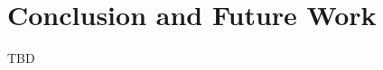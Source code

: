 \documentclass[conference]{IEEEtran}
\newlength{\dummylen}
\newcommand{\NOTE}[1]{\setlength{\dummylen}{\fboxrule}\setlength{\fboxrule}{2pt}%
            \vspace{1ex}\noindent\hfill%
            \fbox{\begin{minipage}{.96\columnwidth}#1\end{minipage}}%
            \setlength{\fboxrule}{\dummylen}\hfill{}\vspace{1ex}}
\begin{document}








\section{Conclusion and Future Work}
\label{sec:concl}
TBD



\end{document}
